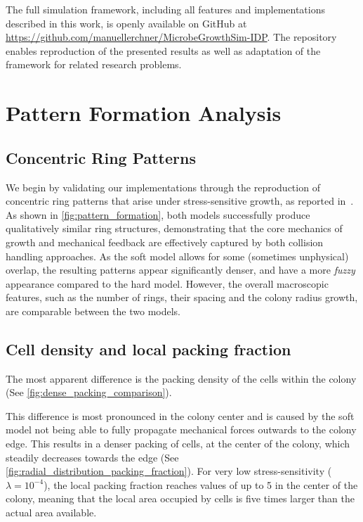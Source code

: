\documentclass[conference]{IEEEtran}
\begin{document}
The full simulation framework, including all features and implementations described in this work, is openly available on GitHub at \url{https://github.com/manuellerchner/MicrobeGrowthSim-IDP}.
The repository enables reproduction of the presented results as well as adaptation of the framework for related research problems.

\section{Pattern Formation Analysis}

\subsection{Concentric Ring Patterns}

We begin by validating our implementations through the reproduction of concentric ring patterns that arise under stress-sensitive growth, as reported in~\cite{Weady2024}. As shown in \autoref{fig:pattern_formation}, both models successfully produce qualitatively similar ring structures, demonstrating that the core mechanics of growth and mechanical feedback are effectively captured by both collision handling approaches. As the soft model allows for some (sometimes unphysical) overlap, the resulting patterns appear significantly denser, and have a more \emph{fuzzy} appearance compared to the hard model. However, the overall macroscopic features, such as the number of rings, their spacing and the colony radius growth, are comparable between the two models.


\subsection{Cell density and local packing fraction}

The most apparent difference is the packing density of the cells within the colony (See \autoref{fig:dense_packing_comparison}).

This difference is most pronounced in the colony center and is caused by the soft model not being able to fully propagate mechanical forces outwards to the colony edge. This results in a denser packing of cells, at the center of the colony, which steadily decreases towards the edge (See \autoref{fig:radial_distribution_packing_fraction}). For very low stress-sensitivity ($\lambda = 10^{-4}$), the local packing fraction reaches values of up to 5 in the center of the colony, meaning that the local area occupied by cells is five times larger than the actual area available.
\end{document}
